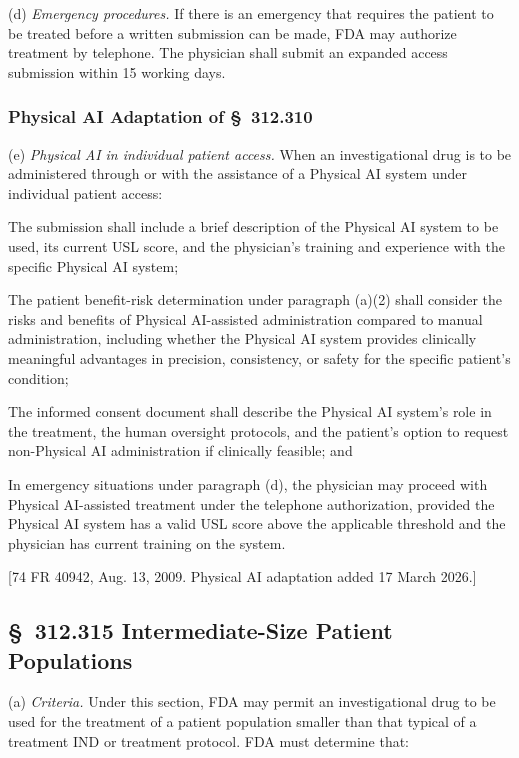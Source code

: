 \documentclass[11pt]{article}
\begin{document}
(d) \textit{Emergency procedures.} If there is an emergency that requires the patient to be treated before a written submission can be made, FDA may authorize treatment by telephone. The physician shall submit an expanded access submission within 15 working days.

\subsubsection{Physical AI Adaptation of \S~312.310}

(e) \textit{Physical AI in individual patient access.} When an investigational drug is to be administered through or with the assistance of a Physical AI system under individual patient access:

\begin{description}[leftmargin=0.8cm,style=sameline]
\item[(i)] The submission shall include a brief description of the Physical AI system to be used, its current USL score, and the physician's training and experience with the specific Physical AI system;
\item[(ii)] The patient benefit-risk determination under paragraph (a)(2) shall consider the risks and benefits of Physical AI-assisted administration compared to manual administration, including whether the Physical AI system provides clinically meaningful advantages in precision, consistency, or safety for the specific patient's condition;
\item[(iii)] The informed consent document shall describe the Physical AI system's role in the treatment, the human oversight protocols, and the patient's option to request non-Physical AI administration if clinically feasible; and
\item[(iv)] In emergency situations under paragraph (d), the physician may proceed with Physical AI-assisted treatment under the telephone authorization, provided the Physical AI system has a valid USL score above the applicable threshold and the physician has current training on the system.
\end{description}

[74 FR 40942, Aug. 13, 2009. Physical AI adaptation added 17 March 2026.]

\subsection{\S~312.315 Intermediate-Size Patient Populations}

(a) \textit{Criteria.} Under this section, FDA may permit an investigational drug to be used for the treatment of a patient population smaller than that typical of a treatment IND or treatment protocol. FDA must determine that:
\end{document}
